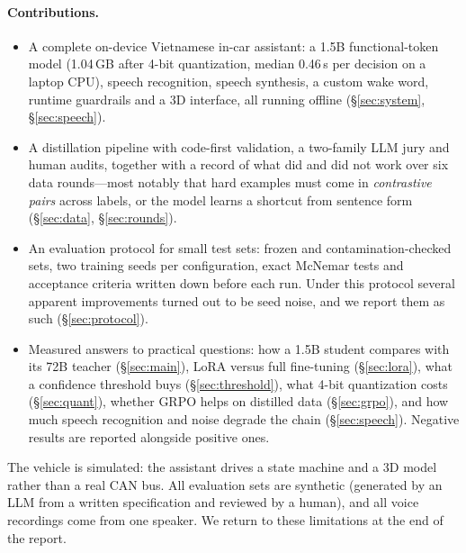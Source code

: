 \paragraph{Contributions.}
\begin{itemize}
  \item A complete on-device Vietnamese in-car assistant: a 1.5B functional-token model (1.04\,GB after 4-bit
  quantization, median 0.46\,s per decision on a laptop CPU), speech recognition, speech synthesis, a custom wake word,
  runtime guardrails and a 3D interface, all running offline (\S\ref{sec:system}, \S\ref{sec:speech}).
  \item A distillation pipeline with code-first validation, a two-family LLM jury and human audits, together with a record of
  what did and did not work over six data rounds---most notably that hard examples must come in \emph{contrastive pairs}
  across labels, or the model learns a shortcut from sentence form (\S\ref{sec:data}, \S\ref{sec:rounds}).
  \item An evaluation protocol for small test sets: frozen and contamination-checked sets, two training seeds per
  configuration, exact McNemar tests and acceptance criteria written down before each run. Under this protocol several
  apparent improvements turned out to be seed noise, and we report them as such (\S\ref{sec:protocol}).
  \item Measured answers to practical questions: how a 1.5B student compares with its 72B teacher (\S\ref{sec:main}), LoRA
  versus full fine-tuning (\S\ref{sec:lora}), what a confidence threshold buys (\S\ref{sec:threshold}), what 4-bit
  quantization costs (\S\ref{sec:quant}), whether GRPO helps on distilled data (\S\ref{sec:grpo}), and how much speech
  recognition and noise degrade the chain (\S\ref{sec:speech}). Negative results are reported alongside positive ones.
\end{itemize}

The vehicle is simulated: the assistant drives a state machine and a 3D model rather than a real CAN bus. All evaluation sets
are synthetic (generated by an LLM from a written specification and reviewed by a human), and all voice recordings come from
one speaker. We return to these limitations at the end of the report.
